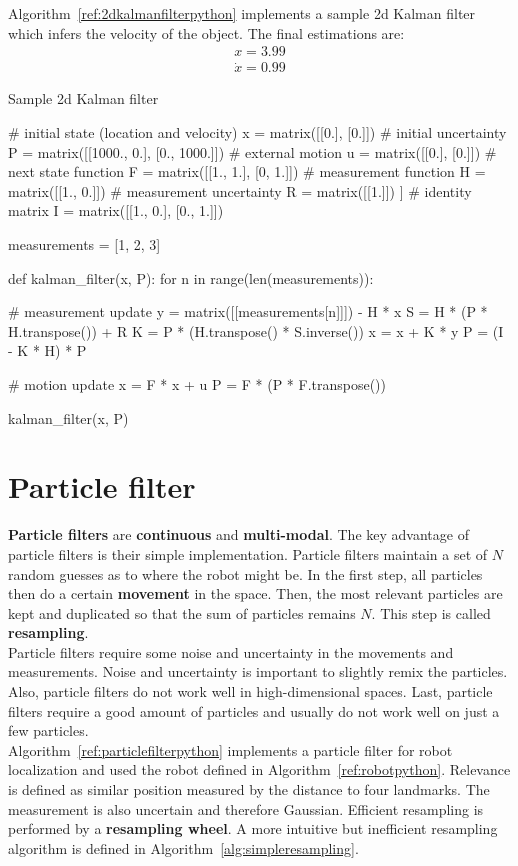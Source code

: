 \documentclass{report}
\begin{document}
Algorithm~\ref{ref:2dkalmanfilterpython} implements a sample 2d Kalman filter which infers the velocity of the object. The final estimations are:
\begin{align*}
x = 3.99 \\
\dot{x} = 0.99
\end{align*}

\begin{algorithm}
\caption{Sample 2d Kalman filter}
\label{ref:2dkalmanfilterpython}
\begin{python}
# initial state (location and velocity)
x = matrix([[0.], [0.]])
# initial uncertainty
P = matrix([[1000., 0.], [0., 1000.]])
# external motion
u = matrix([[0.], [0.]])
# next state function
F = matrix([[1., 1.], [0, 1.]])
# measurement function
H = matrix([[1., 0.]])
# measurement uncertainty
R = matrix([[1.]]) ]
# identity matrix
I = matrix([[1., 0.], [0., 1.]])

measurements = [1, 2, 3]

def kalman_filter(x, P):
    for n in range(len(measurements)):

        # measurement update
        y = matrix([[measurements[n]]]) - H * x
        S = H * (P * H.transpose()) + R
        K = P * (H.transpose() * S.inverse())
        x = x + K * y
        P = (I - K * H) * P

        # motion update
        x = F * x + u
        P = F * (P * F.transpose())

kalman_filter(x, P)
\end{python}
\end{algorithm}

\section{Particle filter}
{\bf Particle filters} are {\bf continuous} and {\bf multi-modal}. The key advantage of particle filters is their simple implementation. Particle filters maintain a set of $N$ random guesses as to where the robot might be. In the first step, all particles then do a certain {\bf movement} in the space. Then, the most relevant particles are kept and duplicated so that the sum of particles remains $N$. This step is called {\bf resampling}. \\
Particle filters require some noise and uncertainty in the movements and measurements. Noise and uncertainty is important to slightly remix the particles. Also, particle filters do not work well in high-dimensional spaces. Last, particle filters require a good amount of particles and usually do not work well on just a few particles.
\\
Algorithm~\ref{ref:particlefilterpython} implements a particle filter for robot localization and used the robot defined in Algorithm~\ref{ref:robotpython}. Relevance is defined as similar position measured by the distance to four landmarks. The measurement is also uncertain and therefore Gaussian. Efficient resampling is performed by a {\bf resampling wheel}.
A more intuitive but inefficient resampling algorithm is defined in Algorithm~\ref{alg:simpleresampling}.
\end{document}
